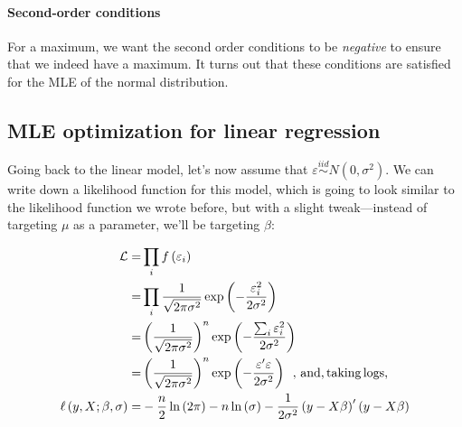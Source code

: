 \documentclass[12pt,english]{article}
\begin{document}
\paragraph{Second-order conditions}

For a maximum, we want the second order conditions to be \emph{negative} to ensure that we indeed have a maximum. It turns out that these conditions are satisfied for the MLE of the normal distribution.

\subsection{MLE optimization for linear regression}
Going back to the linear model, let's now assume that $\varepsilon \overset{iid}{\sim}N\left(0,\sigma^2\right)$. We can write down a likelihood function for this model, which is going to look similar to the likelihood function we wrote before, but with a slight tweak---instead of targeting $\mu$ as a parameter, we'll be targeting $\beta$:

\begin{align*}
    \mathcal{L} =& \prod_{i} f\left(\varepsilon_{i}\right) \\
    =& \prod_{i} \frac{1}{\sqrt{2\pi \sigma^{2}}} \exp \left(-\frac{\varepsilon_{i}^{2}}{2\sigma^{2}}\right) \\
    =& \left(\frac{1}{\sqrt{2\pi \sigma^{2}}}\right)^{n} \exp \left(-\frac{\sum_{i}\varepsilon_{i}^{2}}{2\sigma^{2}}\right) \\
    =& \left(\frac{1}{\sqrt{2\pi \sigma^{2}}}\right)^{n} \exp \left(-\frac{\varepsilon^{\prime}\varepsilon}{2\sigma^{2}}\right)\,\,\,,\,\text{and,\,taking\,logs,} \\
    \ell\left(y,X;\beta,\sigma\right)    =& -\frac{n}{2}\ln\left(2\pi\right) - n \ln \left(\sigma\right) - \frac{1}{2\sigma^{2}}\left(y-X\beta\right)^{\prime}\left(y-X\beta\right)
\end{align*}
\end{document}
